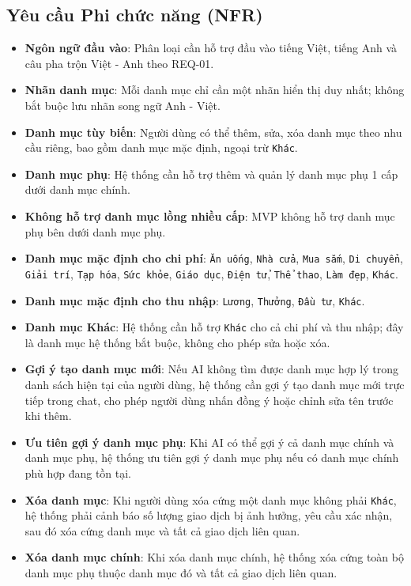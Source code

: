 \subsection{Yêu cầu Phi chức năng (NFR)}

\begin{itemize}
\item \textbf{Ngôn ngữ đầu vào}: Phân loại cần hỗ trợ đầu vào tiếng Việt, tiếng Anh và câu pha trộn Việt - Anh theo REQ-01.
\item \textbf{Nhãn danh mục}: Mỗi danh mục chỉ cần một nhãn hiển thị duy nhất; không bắt buộc lưu nhãn song ngữ Anh - Việt.
\item \textbf{Danh mục tùy biến}: Người dùng có thể thêm, sửa, xóa danh mục theo nhu cầu riêng, bao gồm danh mục mặc định, ngoại trừ \texttt{Khác}.
\item \textbf{Danh mục phụ}: Hệ thống cần hỗ trợ thêm và quản lý danh mục phụ 1 cấp dưới danh mục chính.
\item \textbf{Không hỗ trợ danh mục lồng nhiều cấp}: MVP không hỗ trợ danh mục phụ bên dưới danh mục phụ.
\item \textbf{Danh mục mặc định cho chi phí}: \texttt{Ăn uống}, \texttt{Nhà cửa}, \texttt{Mua sắm}, \texttt{Di chuyển}, \texttt{Giải trí}, \texttt{Tạp hóa}, \texttt{Sức khỏe}, \texttt{Giáo dục}, \texttt{Điện tử}, \texttt{Thể thao}, \texttt{Làm đẹp}, \texttt{Khác}.
\item \textbf{Danh mục mặc định cho thu nhập}: \texttt{Lương}, \texttt{Thưởng}, \texttt{Đầu tư}, \texttt{Khác}.
\item \textbf{Danh mục Khác}: Hệ thống cần hỗ trợ \texttt{Khác} cho cả chi phí và thu nhập; đây là danh mục hệ thống bắt buộc, không cho phép sửa hoặc xóa.
\item \textbf{Gợi ý tạo danh mục mới}: Nếu AI không tìm được danh mục hợp lý trong danh sách hiện tại của người dùng, hệ thống cần gợi ý tạo danh mục mới trực tiếp trong chat, cho phép người dùng nhấn đồng ý hoặc chỉnh sửa tên trước khi thêm.
\item \textbf{Ưu tiên gợi ý danh mục phụ}: Khi AI có thể gợi ý cả danh mục chính và danh mục phụ, hệ thống ưu tiên gợi ý danh mục phụ nếu có danh mục chính phù hợp đang tồn tại.
\item \textbf{Xóa danh mục}: Khi người dùng xóa cứng một danh mục không phải \texttt{Khác}, hệ thống phải cảnh báo số lượng giao dịch bị ảnh hưởng, yêu cầu xác nhận, sau đó xóa cứng danh mục và tất cả giao dịch liên quan.
\item \textbf{Xóa danh mục chính}: Khi xóa danh mục chính, hệ thống xóa cứng toàn bộ danh mục phụ thuộc danh mục đó và tất cả giao dịch liên quan.

\end{itemize}
